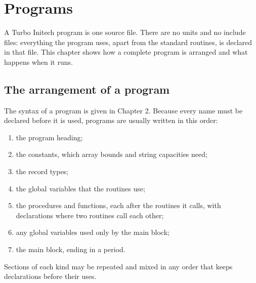 \chapter{Programs}

A Turbo Initech program is one source file.  There are no units and no
include files: everything the program uses, apart from the standard
routines, is declared in that file.  This chapter shows how a complete
program is arranged and what happens when it runs.

\section{The arrangement of a program}
The syntax of a program is given in Chapter 2.  Because every name must be
declared before it is used, programs are usually written in this order:

\begin{enumerate}
\item the program heading;
\item the constants, which array bounds and string capacities need;
\item the record types;
\item the global variables that the routines use;
\item the procedures and functions, each after the routines it calls,
  with  declarations where two routines call each other;
\item any global variables used only by the main block;
\item the main block, ending in a period.
\end{enumerate}

Sections of each kind may be repeated and mixed in any order that keeps
declarations before their uses.



